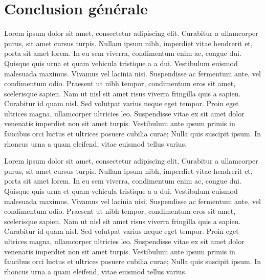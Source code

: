 \chapter*{Conclusion générale}
\lhead{}
Lorem ipsum dolor sit amet, consectetur adipiscing elit. Curabitur a ullamcorper purus, sit amet cursus turpis. Nullam ipsum nibh, imperdiet vitae hendrerit et, porta sit amet lorem. In eu sem viverra, condimentum enim ac, congue dui. Quisque quis urna et quam vehicula tristique a a dui. Vestibulum euismod malesuada maximus. Vivamus vel lacinia nisi. Suspendisse ac fermentum ante, vel condimentum odio. Praesent ut nibh tempor, condimentum eros sit amet, scelerisque sapien. Nam ut nisl sit amet risus viverra fringilla quis a sapien. Curabitur id quam nisl. Sed volutpat varius neque eget tempor. Proin eget ultrices magna, ullamcorper ultricies leo. Suspendisse vitae ex sit amet dolor venenatis imperdiet non sit amet turpis. Vestibulum ante ipsum primis in faucibus orci luctus et ultrices posuere cubilia curae; Nulla quis suscipit ipsum. In rhoncus urna a quam eleifend, vitae euismod tellus varius.

Lorem ipsum dolor sit amet, consectetur adipiscing elit. Curabitur a ullamcorper purus, sit amet cursus turpis. Nullam ipsum nibh, imperdiet vitae hendrerit et, porta sit amet lorem. In eu sem viverra, condimentum enim ac, congue dui. Quisque quis urna et quam vehicula tristique a a dui. Vestibulum euismod malesuada maximus. Vivamus vel lacinia nisi. Suspendisse ac fermentum ante, vel condimentum odio. Praesent ut nibh tempor, condimentum eros sit amet, scelerisque sapien. Nam ut nisl sit amet risus viverra fringilla quis a sapien. Curabitur id quam nisl. Sed volutpat varius neque eget tempor. Proin eget ultrices magna, ullamcorper ultricies leo. Suspendisse vitae ex sit amet dolor venenatis imperdiet non sit amet turpis. Vestibulum ante ipsum primis in faucibus orci luctus et ultrices posuere cubilia curae; Nulla quis suscipit ipsum. In rhoncus urna a quam eleifend, vitae euismod tellus varius.